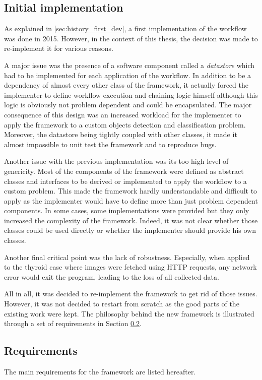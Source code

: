 \subsection{Initial implementation}
\label{ssec:work_init_impl}
As explained in \ref{sec:history_first_dev}, a first implementation of the workflow was done in 2015. However, in the context of this thesis, the decision was made to re-implement it for various reasons.

A major issue was the presence of a software component called a \textit{datastore} which had to be implemented for each application of the workflow. In addition to be a dependency of almost every other class of the framework, it actually forced the implementer to define workflow execution and chaining logic himself although this logic is obviously not problem dependent and could be encapsulated. The major consequence of this design was an increased workload for the implementer to apply the framework to a custom objects detection and classification problem. Moreover, the datastore being tightly coupled with other classes, it made it almost impossible to unit test the framework and to reproduce bugs.

Another issue with the previous implementation was its too high level of genericity. Most of the components of the framework were defined as abstract classes and interfaces to be derived or implemented to apply the workflow to a custom problem. This made the framework hardly understandable and difficult to apply as the implementer would have to define more than just problem dependent components. In some cases, some implementations were provided but they only increased the complexity of the framework. Indeed, it was not clear whether those classes could be used directly or whether the implementer should provide his own classes.

Another final critical point was the lack of robustness. Especially, when applied to the thyroid case where images were fetched using HTTP requests, any network error would exit the program, leading to the loss of all collected data.

All in all, it was decided to re-implement the framework to get rid of those issues. However, it was not decided to restart from scratch as the good parts of the existing work were kept. The philosophy behind the new framework is illustrated through a set of requirements in Section \ref{ssec:work_requirements}.

\subsection{Requirements}
\label{ssec:work_requirements}
The main requirements for the framework are listed hereafter.

